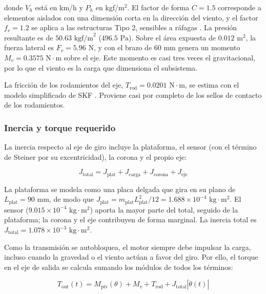 \documentclass[../../General.tex]{subfiles}
\begin{document}
donde $V_h$ está en km/h y $P_h$ en kgf/m$^2$. El factor de forma $C = 1.5$ corresponde a elementos aislados con una dimensión corta en la dirección del viento, y el factor $f_r = 1.2$ se aplica a las estructuras Tipo 2, sensibles a ráfagas \citep{nte_e020}. La presión resultante es de $50.63\text{ kgf/m}^2$ ($496.5\text{ Pa}$). Sobre el área expuesta de $0.012\text{ m}^2$, la fuerza lateral es $F_v = 5.96\text{ N}$, y con el brazo de $60\text{ mm}$ genera un momento $M_v = 0.3575\text{ N}\cdot\text{m}$ sobre el eje. Este momento es casi tres veces el gravitacional, por lo que el viento es la carga que dimensiona el subsistema.

La fricción de los rodamientos del eje, $T_{\text{rod}} = 0.0201\text{ N}\cdot\text{m}$, se estima con el modelo simplificado de SKF \citep{skf2020bearings}. Proviene casi por completo de los sellos de contacto de los rodamientos.

\subsubsection{Inercia y torque requerido}

La inercia respecto al eje de giro incluye la plataforma, el sensor (con el término de Steiner por su excentricidad), la corona y el propio eje:

\begin{equation}\label{eq:Jtotal_tilt}
    J_{\text{total}} = J_{\text{plat}} + J_{\text{carga}} + J_{\text{corona}} + J_{\text{eje}}
\end{equation}

La plataforma se modela como una placa delgada que gira en su plano de $L_{\text{plat}} = 90\text{ mm}$, de modo que $J_{\text{plat}} = m_{\text{plat}} L_{\text{plat}}^2/12 = 1.688 \times 10^{-4}\text{ kg}\cdot\text{m}^2$. El sensor ($9.015 \times 10^{-4}\text{ kg}\cdot\text{m}^2$) aporta la mayor parte del total, seguido de la plataforma; la corona y el eje contribuyen de forma marginal. La inercia total es $J_{\text{total}} = 1.078 \times 10^{-3}\text{ kg}\cdot\text{m}^2$.

Como la transmisión se autobloquea, el motor siempre debe impulsar la carga, incluso cuando la gravedad o el viento actúan a favor del giro. Por ello, el torque en el eje de salida se calcula sumando los módulos de todos los términos:

\begin{equation}\label{eq:Tout_tilt}
    T_{\text{out}}(t) = M_{\text{piv}}(\theta) + M_v + T_{\text{rod}} + J_{\text{total}} \left|\ddot{\theta}(t)\right|
\end{equation}
\end{document}
